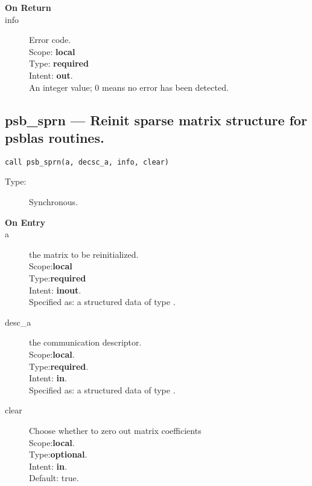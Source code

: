 \begin{description}
\item[\bf On Return]
\item[info] Error code.\\
Scope: {\bf local} \\
Type: {\bf required} \\
Intent: {\bf out}.\\
An integer value; 0 means no error has been detected. 
\end{description}




%
%
\clearpage\subsection*{psb\_sprn --- Reinit sparse matrix structure for psblas
  routines.}

\begin{verbatim}
call psb_sprn(a, decsc_a, info, clear)
\end{verbatim}

\begin{description}
\item[Type:] Synchronous.
\item[\bf On Entry]
\item[a] the matrix to be reinitialized.\\
Scope:{\bf local}\\
Type:{\bf required}\\
Intent: {\bf inout}.\\
Specified as: a structured data of type \spdata.
\item[desc\_a] the communication descriptor.\\
Scope:{\bf local}.\\
Type:{\bf required}.\\
Intent: {\bf in}.\\
Specified as: a structured data of type \descdata.
\item[clear] Choose whether to zero out matrix coefficients\\
Scope:{\bf local}.\\
Type:{\bf optional}.\\
Intent: {\bf in}.\\
Default: true.
\end{description}

